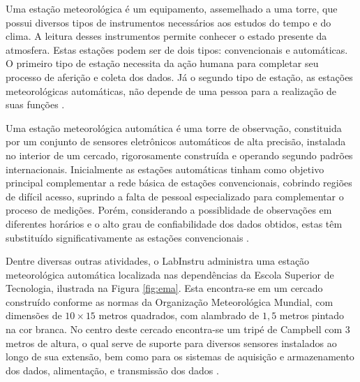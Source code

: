 Uma estação meteorológica é um equipamento, assemelhado a uma torre, que possui diversos tipos de instrumentos necessários aos estudos do tempo e do clima. A leitura desses instrumentos permite conhecer o estado presente da atmosfera. Estas estações podem ser de dois tipos: convencionais e automáticas. O primeiro tipo de estação necessita da ação humana para completar seu processo de aferição e coleta dos dados. Já o segundo tipo de estação, as estações meteorológicas automáticas, não depende de uma pessoa para a realização de suas funções \cite{Vianello:Livro}.

Uma estação meteorológica automática é uma torre de observação, constituida por um conjunto de sensores eletrônicos automáticos de alta precisão, instalada no interior de um cercado, rigorosamente construída e operando segundo padrões internacionais. Inicialmente as estações automáticas tinham como objetivo principal complementar a rede básica de estações convencionais, cobrindo regiões de difícil acesso, suprindo a falta de pessoal especializado para complementar o proceso de medições. Porém, considerando a possiblidade de observações em diferentes horários e o alto grau de confiabilidade dos dados obtidos, estas têm substituído significativamente as estações convencionais  \cite{Vianello:Livro}.

Dentre diversas outras atividades, o LabInstru administra uma estação meteorológica automática localizada nas dependências da Escola Superior de Tecnologia, ilustrada na Figura \ref{fig:ema}. Esta encontra-se em um cercado construído conforme as normas da Organização Meteorológica Mundial, com dimensões de $10 \times 15$ metros quadrados, com alambrado de $1,5$ metros pintado na cor branca. No centro deste cercado encontra-se um tripé de Campbell com $3$ metros de altura, o qual serve de suporte para diversos sensores instalados ao longo de sua extensão, bem como para os sistemas de aquisição e armazenamento dos dados, alimentação, e transmissão dos dados \cite{Labinstru:EST}.

